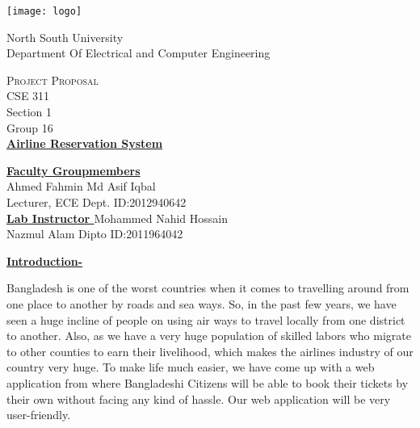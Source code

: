 \documentclass[12pt]{article}
\begin{document}
\begin{center}
\texttt{[image: logo]}\\
\vspace{5mm}

\thispagestyle{empty}
\LARGE{ \rmfamily    North South University} \\
\Large
\vspace{4mm}
\rmfamily  Department Of Electrical and Computer Engineering \\
\vspace{4mm}

\textsc{\LARGE Project Proposal} \\
\vspace{4mm}
CSE 311\\Section 1  \\
Group 16\\
\vspace{4mm}
\vspace{9mm}
\LARGE{\textbf{\underline{\sffamily \color{red} Airline Reservation System}}}\\
\vspace{5mm}
\vspace{5mm}
\end{center}

\textbf{\underline {Faculty }} \hfill  \textbf{\underline {Groupmembers}} \\
Ahmed Fahmin \hfill Md Asif Iqbal \\
Lecturer, ECE Dept. \hfill ID:2012940642 \\ 

\textbf{\underline {Lab Instructor }} \hfill Mohammed Nahid Hossain\\
Nazmul Alam Dipto \hfill ID:2011964042


\clearpage
{} 




\LARGE \textbf{\underline{Introduction-}}   \\ \vspace{2mm}
\normalsize
\begin{singlespace}
Bangladesh is one of the worst countries when it comes to travelling around from one place to another by roads and sea ways. So, in the past few years, we have seen a huge incline of people on using air ways to travel locally from one district to another. Also, as we have a very huge population of skilled labors who migrate to other counties to earn their livelihood, which makes the airlines industry of our country very huge. To make life much easier, we have come up with a web application from where Bangladeshi Citizens will be able to book their tickets by their own without facing any kind of hassle. Our web application will be very user-friendly.\\
\end{singlespace}
 \vspace{5mm}
\end{document}
